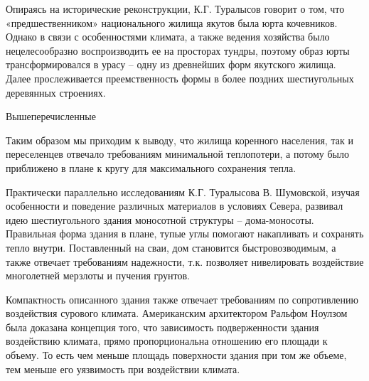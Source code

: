 Опираясь на исторические реконструкции, К.Г. Туралысов говорит о том, что «предшественником» национального жилища якутов была юрта кочевников.
Однако в связи с особенностями климата, а также ведения хозяйства было нецелесообразно воспроизводить ее на просторах тундры,
поэтому образ юрты трансформировался в урасу – одну из древнейших форм якутского жилища.
Далее прослеживается преемственность формы в более поздних шестиугольных деревянных строениях.

Вышеперечисленные 

Таким образом мы приходим к выводу, что жилища коренного населения, так и переселенцев отвечало требованиям минимальной теплопотери,
а потому было приближено в плане к кругу для максимального сохранения тепла.

Практически параллельно исследованиям К.Г. Туралысова В. Шумовской, изучая особенности и поведение различных материалов в условиях Севера,
развивал идею шестиугольного здания моносотной структуры – дома-моносоты. Правильная форма здания в плане, тупые углы помогают накапливать и сохранять тепло внутри.
Поставленный на сваи, дом становится быстровозводимым, а также отвечает требованиям надежности, т.к. позволяет нивелировать воздействие многолетней мерзлоты и пучения грунтов.

Компактность описанного здания также отвечает требованиям по сопротивлению воздействия сурового климата.
Американским архитектором Ральфом Ноулзом была доказана концепция того, что зависимость подверженности здания воздействию климата,
прямо пропорциональна отношению его площади к объему. То есть чем меньше площадь поверхности здания при том же объеме, тем меньше его уязвимость при воздействии климата.


